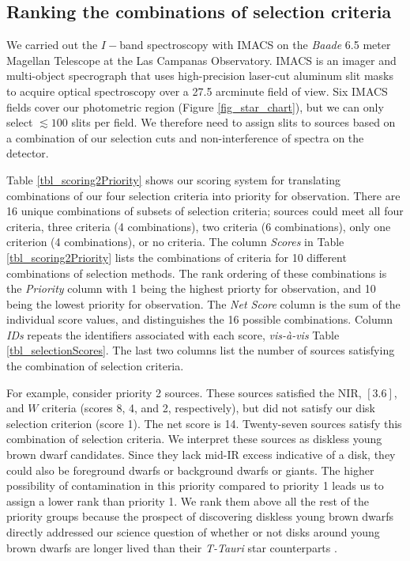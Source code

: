 \subsection{Ranking the combinations of selection criteria}

We carried out the $I-$band spectroscopy with IMACS \citep{2011PASP..123..288D} on the \emph{Baade} 6.5 meter Magellan Telescope \citep{2003SPIE.4837..910S} at the Las Campanas Observatory.  IMACS is an imager and multi-object specrograph that uses high-precision laser-cut aluminum slit masks to acquire optical spectroscopy over a 27.5 arcminute field of view.  Six IMACS fields cover our photometric region (Figure \ref{fig_star_chart}), but we can only select $\lesssim100$ slits per field.  We therefore need to assign slits to sources based on a combination of our selection cuts and non-interference of spectra on the detector.  

Table \ref{tbl_scoring2Priority} shows our scoring system for translating combinations of our four selection criteria into priority for observation.  There are 16 unique combinations of subsets of selection criteria; sources could meet all four criteria, three criteria (4 combinations), two criteria (6 combinations), only one criterion (4 combinations), or no criteria.  The column \emph{Scores} in Table \ref{tbl_scoring2Priority} lists the combinations of criteria for 10 different combinations of selection methods.  The rank ordering of these combinations is the \emph{Priority} column with 1 being the highest priorty for observation, and 10 being the lowest priority for observation.  The \emph{Net Score} column is the sum of the individual score values, and distinguishes the 16 possible combinations.  Column \emph{IDs} repeats the identifiers associated with each score, \emph{vis-\`a-vis} Table \ref{tbl_selectionScores}.  The last two columns list the number of sources satisfying the combination of selection criteria.  

For example, consider priority 2 sources.  These sources satisfied the NIR, $[3.6]$, and $W$ criteria (scores 8, 4, and 2, respectively), but did not satisfy our disk selection criterion (score 1).  The net score is 14.  Twenty-seven sources satisfy this combination of selection criteria.  We interpret these sources as diskless young brown dwarf candidates.  Since they lack mid-IR excess indicative of a disk, they could also be foreground dwarfs or background dwarfs or giants.  The higher possibility of contamination in this priority compared to priority 1 leads us to assign a lower rank than priority 1.  We rank them above all the rest of the priority groups because the prospect of discovering diskless young brown dwarfs directly addressed our science question of whether or not disks around young brown dwarfs are longer lived than their \emph{T-Tauri} star counterparts \citep{2008ApJ...681.1584R}.  

